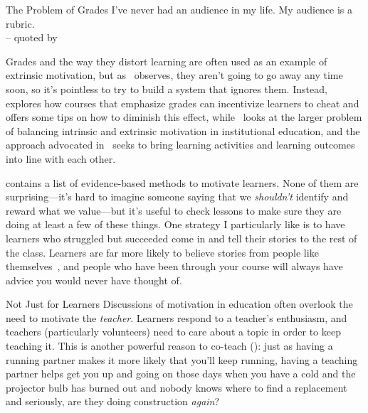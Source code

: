\begin{aside}{The Problem of Grades}
  I've never had an audience in my life. My audience is a rubric.\\
  -- quoted by 

  Grades and the way they distort learning are often used as an example of extrinsic motivation,
  but as~\cite{Mill2016a} observes,
  they aren't going to go away any time soon,
  so it's pointless to try to build a system that ignores them.
  Instead,~\cite{Lang2013} explores how courses that emphasize grades
  can incentivize learners to cheat
  and offers some tips on how to diminish this effect,
  while~\cite{Covi2017} looks at the larger problem of
  balancing intrinsic and extrinsic motivation in institutional education,
  and the  approach
  advocated in~\cite{Bigg2011} seeks to bring learning activities and learning outcomes
  into line with each other.
\end{aside}

\cite{Ambr2010} contains a list of evidence-based methods to motivate learners.
None of them are surprising---it's
hard to imagine someone saying that we \emph{shouldn't} identify and reward what we value---but
it's useful to check lessons to make sure they are doing at least a few of these things.
One strategy I particularly like is
to have learners who struggled but succeeded
come in and tell their stories to the rest of the class.
Learners are far more likely to believe stories from people like themselves~\cite{Mill2016a},
and people who have been through your course
will always have advice you would never have thought of.

\begin{aside}{Not Just for Learners}
  Discussions of motivation in education often overlook the need to motivate the \emph{teacher}.
  Learners respond to a teacher's enthusiasm,
  and teachers (particularly volunteers) need to care about a topic in order to keep teaching it.
  This is another powerful reason to co-teach ():
  just as having a running partner makes it more likely that you'll keep running,
  having a teaching partner helps get you up and going on
  those days when you have a cold
  and the projector bulb has burned out
  and nobody knows where to find a replacement
  and seriously,
  are they doing construction \emph{again}?
\end{aside}

